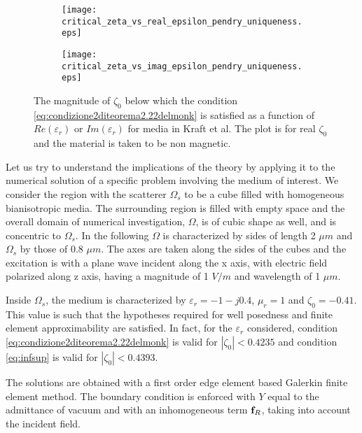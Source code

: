 \begin{figure}[H]
\centering
\begin{subfigure}[b]{0.49\textwidth}
\texttt{[image: critical\_zeta\_vs\_real\_epsilon\_pendry\_uniqueness.eps]}
\end{subfigure}
%
\begin{subfigure}[b]{0.49\textwidth}
\centering
\texttt{[image: critical\_zeta\_vs\_imag\_epsilon\_pendry\_uniqueness.eps]}
\end{subfigure}
\caption{The magnitude of $\zeta_0$ below which the condition \ref{eq:condizione2diteorema2.22delmonk} is satisfied as a function of $Re(\varepsilon_r)$ or $Im(\varepsilon_r)$ for media in Kraft et al.
The plot is for real $\zeta_0$ and the material is taken to be non magnetic.}
\label{fi:critical_zeta_vs_epsilonr_uniqueness}
\end{figure}

Let us try to understand the implications of the theory by applying it to 
the numerical solution of a specific problem involving the medium of interest.
We consider the region with the scatterer $\Omega_{s}$ to be a cube filled 
with homogeneous bianisotropic media.
The surrounding region is filled with empty space and the overall domain 
of numerical investigation, $\Omega$, is of cubic shape as well, and is 
concentric to $\Omega_{s}$.
In the following $\Omega$ is characterized by sides of length 2 $\mu m$ 
and $\Omega_s$ by those of 0.8 $\mu m$.
The axes are taken along the sides of the cubes and the excitation is 
with a plane wave incident along the x axis, with electric field polarized along 
z axis, having a magnitude of 1 $V/m$ and wavelength of 1 $\mu m$.

Inside $\Omega_s$, the medium is characterized by $\varepsilon_r = -1 - j0.4$, 
$\mu_r = 1$ and $\zeta_0 = -0.41$. 
This value is such that the hypotheses required for well posedness and 
finite element approximability are satisfied.
In fact, for the $\varepsilon_r$ considered, condition \ref{eq:condizione2diteorema2.22delmonk} 
is valid for $|\zeta_0| < 0.4235$ and condition \ref{eq:infsup} is valid for 
$|\zeta_0| < 0.4393$.

The solutions are obtained with a first order edge element based Galerkin 
finite element method. The boundary condition is enforced with $Y$ equal to 
the admittance of vacuum and with an inhomogeneous term ${\bf f}_R$, 
taking into account the incident field. 

